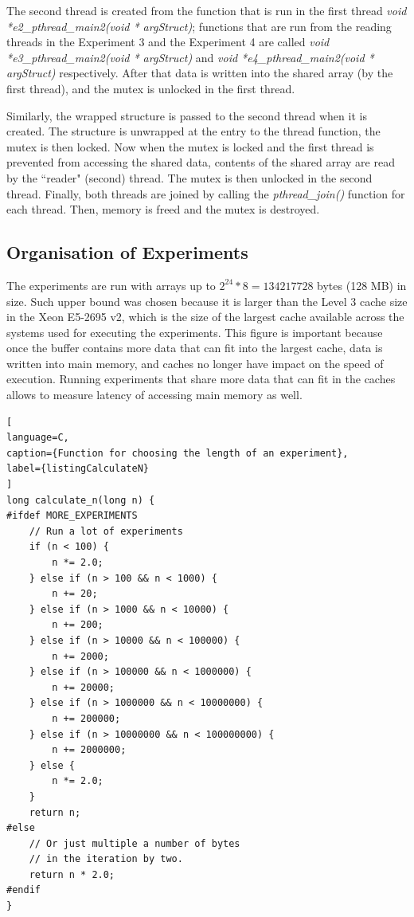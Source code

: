 The second thread is created from the function that is run in the first thread \textit{void *e2\_pthread\_main2(void * argStruct)}; functions that are run from the reading threads in the Experiment 3 and the Experiment 4 are called \textit{void *e3\_pthread\_main2(void * argStruct)} and \textit{void *e4\_pthread\_main2(void * argStruct)} respectively. After that data is written into the shared array (by the first thread), and the mutex is unlocked in the first thread.

Similarly, the wrapped structure is passed to the second thread when it is created. The structure is unwrapped at the entry to the thread function, the mutex is then locked. Now when the mutex is locked and the first thread is prevented from accessing the shared data, contents of the shared array are read by the ``reader" (second) thread. The mutex is then unlocked in the second thread. Finally, both threads are joined by calling the \textit{pthread\_join()} function for each thread. Then, memory is freed and the mutex is destroyed.

\subsection{Organisation of Experiments}
The experiments are run with arrays up to $2^{24} * 8 = 134217728$ bytes (128 MB) in size. Such upper bound was chosen because it is larger than the Level 3 cache size in the Xeon E5-2695 v2, which is the size of the largest cache available across the systems used for executing the experiments. This figure is important because once the buffer contains more data that can fit into the largest cache, data is written into main memory, and caches no longer have impact on the speed of execution. Running experiments that share more data that can fit in the caches allows to measure latency of accessing main memory as well.

\begin{lstlisting}[
language=C,
caption={Function for choosing the length of an experiment},
label={listingCalculateN}
]
long calculate_n(long n) {
#ifdef MORE_EXPERIMENTS
    // Run a lot of experiments
	if (n < 100) {
		n *= 2.0;
	} else if (n > 100 && n < 1000) {
		n += 20;
	} else if (n > 1000 && n < 10000) {
		n += 200;
	} else if (n > 10000 && n < 100000) {
		n += 2000;
	} else if (n > 100000 && n < 1000000) {
		n += 20000;
	} else if (n > 1000000 && n < 10000000) {
		n += 200000;
	} else if (n > 10000000 && n < 100000000) {
		n += 2000000;
	} else {
		n *= 2.0;
	}
	return n;
#else
    // Or just multiple a number of bytes
    // in the iteration by two.
	return n * 2.0; 
#endif
}
\end{lstlisting}


